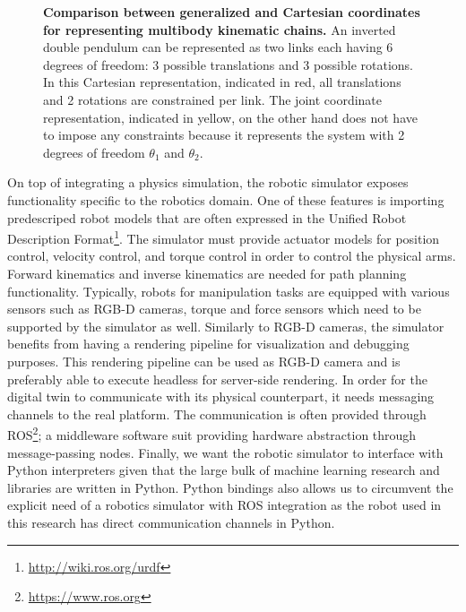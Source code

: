 \documentclass[\home/main.tex]{subfiles}
\begin{document}
\begin{figure}
    \centering
	
    \caption[Comparison between generalized and Cartesian coordinates for representing multibody kinematic chains.]{\textbf{Comparison between generalized and Cartesian coordinates for representing multibody kinematic chains.} An inverted double pendulum can be represented as two links each having 6 degrees of freedom: 3 possible translations and 3 possible rotations. In this \textcolor{ColorAccent1Strong}{Cartesian representation}, indicated in \textcolor{ColorAccent1Strong}{red}, all translations and 2 rotations are constrained per link. The \textcolor{ColorAccent2Strong}{joint coordinate representation}, indicated in \textcolor{ColorAccent2Strong}{yellow}, on the other hand does not have to impose any constraints because it represents the system with 2 degrees of freedom $\theta_1$ and $\theta_2$.}
    \label{fig:generalized_vs_cartesian_coordinates}
\end{figure}

On top of integrating a physics simulation, the robotic simulator exposes functionality specific to the robotics domain.
One of these features is importing predescriped robot models that are often expressed in the Unified Robot Description Format\footnote{\url{http://wiki.ros.org/urdf}}. 
The simulator must provide actuator models for position control, velocity control, and torque control in order to control the physical arms. 
Forward kinematics and inverse kinematics are needed for path planning functionality. 
Typically, robots for manipulation tasks are equipped with various sensors such as RGB-D cameras, torque and force sensors which need to be supported by the simulator as well. 
Similarly to RGB-D cameras, the simulator benefits from having a rendering pipeline for visualization and debugging purposes. This rendering pipeline can be used as RGB-D camera and is preferably able to execute headless for server-side rendering.  
In order for the digital twin to communicate with its physical counterpart, it needs messaging channels to the real platform. The communication is often provided through ROS\footnote{\url{https://www.ros.org}}; a middleware software suit providing hardware abstraction through message-passing nodes. 
Finally, we want the robotic simulator to interface with Python interpreters given that the large bulk of machine learning research and libraries are written in Python. Python bindings also allows us to circumvent the explicit need of a robotics simulator with ROS integration as the robot used in this research has direct communication channels in Python. 
\end{document}
